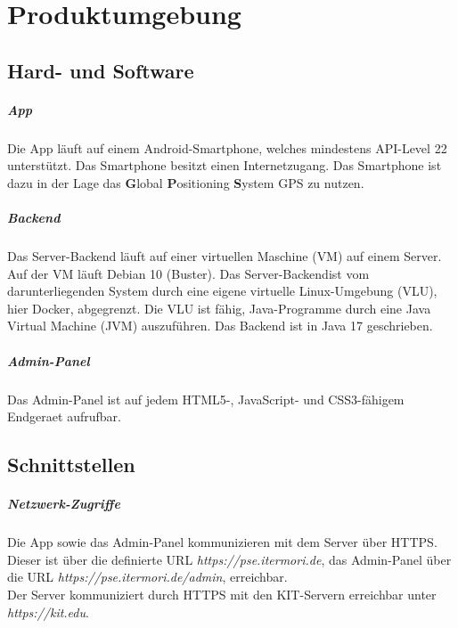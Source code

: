 \newpage
\chapter{Produktumgebung}

\section{Hard- und Software}
    \paragraph{App}
        Die App läuft auf einem \Gls{Android}-\Gls{Smartphone}, welches mindestens \Gls{API-Level} 22 unterstützt.
        Das \Gls{Smartphone} besitzt einen Internetzugang.
        Das \Gls{Smartphone} ist dazu in der Lage das \textbf{G}lobal \textbf{P}ositioning \textbf{S}ystem \Gls{GPS} zu nutzen.

    \paragraph{Backend}
        Das \Gls{Server}-\Gls{Backend} läuft auf einer virtuellen Maschine (\Gls{VM}) auf einem \Gls{Server}.
        Auf der \Gls{VM} läuft \Gls{Debian} 10 (Buster).
        Das \Gls{Server}-\Gls{Backend}ist vom darunterliegenden System durch eine eigene virtuelle Linux-Umgebung (\Gls{VLU}), hier \Gls{Docker}, abgegrenzt.
        Die \Gls{VLU} ist fähig, \Gls{Java}-Programme durch eine Java Virtual Machine (\Gls{JVM}) auszuführen.
        Das \Gls{Backend} ist in \Gls{Java} 17 geschrieben.

    \paragraph{Admin-Panel}
        Das \Gls{Admin-Panel} ist auf jedem \Gls{HTML5}-, \Gls{JavaScript}- und \Gls{CSS3}-fähigem \Gls{Endgeraet} aufrufbar.

\section{Schnittstellen}
    \paragraph{Netzwerk-Zugriffe}
        Die App sowie das \Gls{Admin-Panel} kommunizieren mit dem \Gls{Server} über \Gls{HTTPS}. Dieser ist über die definierte \Gls{URL} \textit{https://pse.itermori.de},
        das \Gls{Admin-Panel} über die \Gls{URL} \textit{https://pse.itermori.de/admin}, erreichbar. \\
        Der \Gls{Server} kommuniziert durch \Gls{HTTPS} mit den \Gls{KIT}-Servern erreichbar unter \textit{https://kit.edu}.
